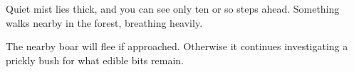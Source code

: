 \begin{boxtext}
  Quiet mist lies thick, and you can see only ten or so \glspl{step} ahead.
  Something walks nearby in the forest, breathing heavily.
\end{boxtext}

The nearby boar will flee if approached.
Otherwise it continues investigating a prickly bush for what edible bits remain.

\boar

